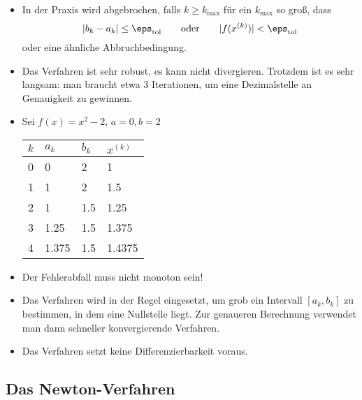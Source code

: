 \documentclass[11pt]{scrbook}
\begin{document}
\begin{nt*}
	\begin{itemize}
		\item
			In der Praxis wird abgebrochen, falls $k \ge k_{\text{max}}$ für ein $k_{\text{max}}$ so groß, dass
			\[
				|b_k -a_k| \le \eps_{\text{tol}}
				\qquad
				\text{oder}
				\qquad
				|f(x^{(k)})| < \eps_{\text{tol}}
			\]
			oder eine ähnliche Abbruchbedingung.
		\item
			Das Verfahren ist sehr robust, es kann nicht divergieren.
			Trotzdem ist es sehr langsam: man braucht etwa 3 Iterationen, um eine Dezimalstelle an Genauigkeit zu gewinnen.
		\item
			Sei $f(x) = x^2 - 2$, $a=0, b=2$
			\begin{table}[H]
				\centering
				\begin{tabular}{c|l|l|l}
					$k$ & $a_k$ & $b_k$ & $x^{(k)}$ \\ \hline
					0 & 0 & 2 & 1 \\
					1 & 1 & 2 & 1.5 \\
					2 & 1 & 1.5 & 1.25 \\
					3 & 1.25 & 1.5 & 1.375 \\
					4 & 1.375 & 1.5 & 1.4375 
				\end{tabular}
			\end{table}
		\item
			Der Fehlerabfall muss nicht monoton sein!
		\item
			Das Verfahren wird in der Regel eingesetzt, um grob ein Intervall $[a_k,b_k]$ zu bestimmen, in dem eine Nullstelle liegt.
			Zur genaueren Berechnung verwendet man dann schneller konvergierende Verfahren.
		\item
			Das Verfahren setzt keine Differenzierbarkeit voraus.
	\end{itemize}
\end{nt*}

\subsection{Das Newton-Verfahren}
\end{document}
